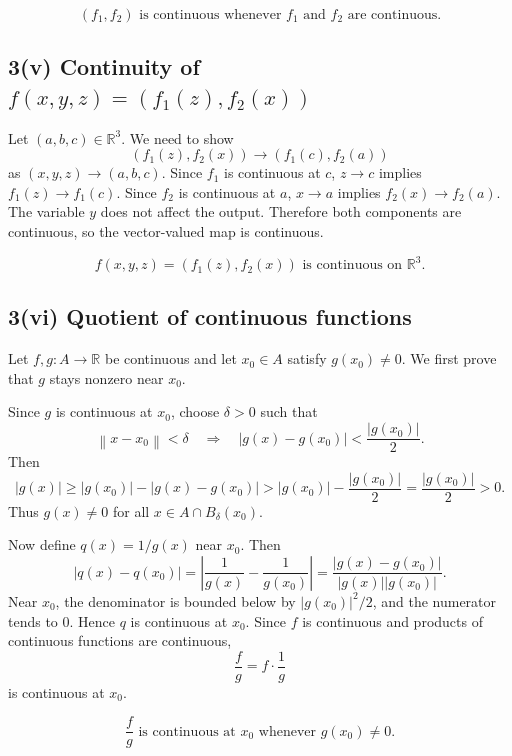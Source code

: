 \documentclass[11pt]{article}
\newcommand{\R}{\mathbb{R}}
\newcommand{\norm}[1]{\left\lVert #1 \right\rVert}
\begin{document}
\begin{answerbox}
\[
\boxed{(f_1,f_2)\text{ is continuous whenever }f_1\text{ and }f_2\text{ are continuous.}}
\]
\end{answerbox}

\subsection{3(v) Continuity of \(f(x,y,z)=(f_1(z),f_2(x))\)}

Let \((a,b,c)\in\R^3\). We need to show
\[
(f_1(z),f_2(x))\to (f_1(c),f_2(a))
\]
as \((x,y,z)\to(a,b,c)\). Since \(f_1\) is continuous at \(c\), \(z\to c\) implies \(f_1(z)\to f_1(c)\). Since \(f_2\) is continuous at \(a\), \(x\to a\) implies \(f_2(x)\to f_2(a)\). The variable \(y\) does not affect the output. Therefore both components are continuous, so the vector-valued map is continuous.

\begin{answerbox}
\[
\boxed{f(x,y,z)=(f_1(z),f_2(x))\text{ is continuous on }\R^3.}
\]
\end{answerbox}

\subsection{3(vi) Quotient of continuous functions}

Let \(f,g:A\to\R\) be continuous and let \(x_0\in A\) satisfy \(g(x_0)\neq0\). We first prove that \(g\) stays nonzero near \(x_0\).

Since \(g\) is continuous at \(x_0\), choose \(\delta>0\) such that
\[
\norm{x-x_0}<\delta\quad\Rightarrow\quad |g(x)-g(x_0)|<\frac{|g(x_0)|}{2}.
\]
Then
\[
|g(x)|\geq |g(x_0)|-|g(x)-g(x_0)|>
|g(x_0)|-\frac{|g(x_0)|}{2}
=\frac{|g(x_0)|}{2}>0.
\]
Thus \(g(x)\neq0\) for all \(x\in A\cap B_\delta(x_0)\).

Now define \(q(x)=1/g(x)\) near \(x_0\). Then
\[
\left|q(x)-q(x_0)\right|
=\left|\frac{1}{g(x)}-\frac{1}{g(x_0)}\right|
=\frac{|g(x)-g(x_0)|}{|g(x)||g(x_0)|}.
\]
Near \(x_0\), the denominator is bounded below by \(|g(x_0)|^2/2\), and the numerator tends to \(0\). Hence \(q\) is continuous at \(x_0\). Since \(f\) is continuous and products of continuous functions are continuous,
\[
\frac{f}{g}=f\cdot\frac1g
\]
is continuous at \(x_0\).

\begin{answerbox}
\[
\boxed{\frac{f}{g}\text{ is continuous at }x_0\text{ whenever }g(x_0)\neq0.}
\]
\end{answerbox}
\end{document}
